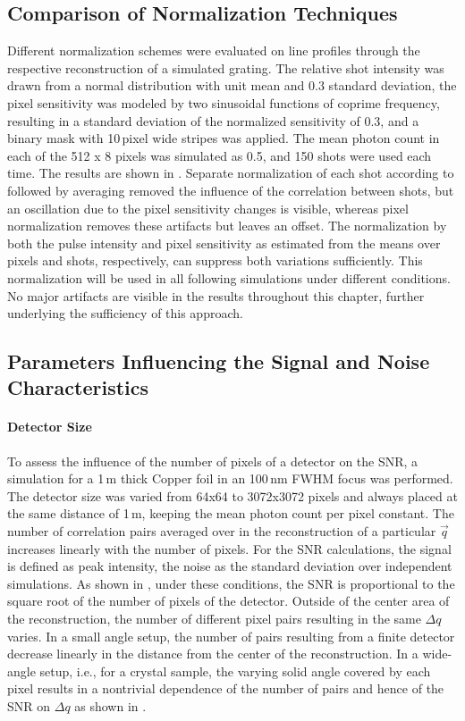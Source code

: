 \subsection{Comparison of Normalization Techniques}
Different normalization schemes were evaluated on line profiles through the respective reconstruction of a simulated grating. The relative shot intensity was drawn from a normal distribution with unit mean and 0.3 standard deviation, the pixel sensitivity was modeled by two sinusoidal functions of coprime frequency, resulting in a standard deviation of the normalized sensitivity of 0.3, and a binary mask with 10\,pixel wide stripes was applied. The mean photon count in each of the 512 x 8 pixels was simulated as 0.5, and 150 shots were used each time. The results are shown in .
Separate normalization of each shot according to   followed by averaging removed the influence of the correlation between shots, but an oscillation due to the pixel sensitivity changes is visible, whereas pixel normalization removes these artifacts but leaves an offset. The normalization by both the pulse intensity and pixel sensitivity as estimated from the means over pixels and shots, respectively, can suppress both variations sufficiently. This normalization will be used in all following simulations under different conditions. No major artifacts are visible in the results throughout this chapter, further underlying the sufficiency of this approach.

\subsection{Parameters Influencing the Signal and Noise Characteristics}
\paragraph{Detector Size}

To assess the influence of the number of pixels of a detector on the SNR, a simulation for a 1\,\textmu m thick Copper foil in an 100\,nm FWHM focus was performed. The detector size was varied from 64x64 to 3072x3072 pixels and always placed at the same distance of 1\,m, keeping the mean photon count per pixel constant. The number of correlation pairs averaged over in the reconstruction of a particular $\vec{q}$ increases linearly with the number of pixels. For the SNR calculations, the signal is defined as peak intensity, the noise as the standard deviation over independent simulations.  As shown in , under these conditions, the SNR is proportional to the square root of the number of pixels of the detector. 
Outside of the center area of the reconstruction, the number of different pixel pairs resulting in the same $\Delta{q}$ varies. In a small angle setup, the number of pairs resulting from a finite detector decrease linearly in the distance from the center of the reconstruction. In a wide-angle setup, i.e., for a crystal sample, the varying solid angle covered by each pixel results in a nontrivial dependence of the number of pairs and hence of the SNR on $\Delta{q}$ as shown in .




